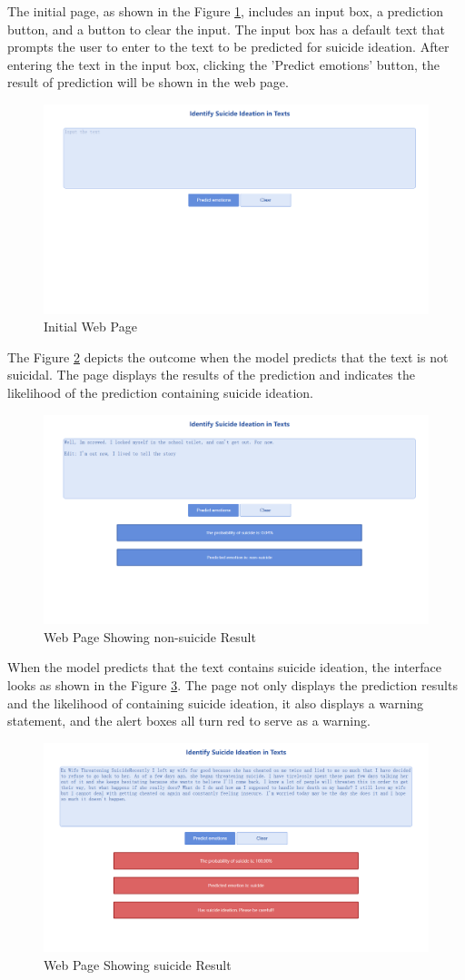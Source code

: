 \documentclass[ %
                    author={Bocheng Wang},
                supervisor={Dr. Qiang Liu},
                    degree={MSc},
                     title={A Research on Identification of Suicide Ideation in Texts with Multiple Models},
                      type={},
                      year={2024}]{dissertation}
\begin{document}
The initial page, as shown in the Figure \ref{fig:pageinitial}, includes an input box, a prediction button, and a button to clear the input. The input box has a default text that prompts the user to enter to the text to be predicted for suicide ideation. After entering the text in the input box, clicking the 'Predict emotions' button, the result of prediction will be shown in the web page.

\begin{figure}[h]
      \centering
      \includegraphics[width=0.57\linewidth]{../img/page_initial.png}
      \caption{Initial Web Page}
      \label{fig:pageinitial}
\end{figure}

The Figure \ref{fig:pagenon} depicts the outcome when the model predicts that the text is not suicidal. The page displays the results of the prediction and indicates the likelihood of the prediction containing suicide ideation.

\begin{figure}[h]
      \centering
      \includegraphics[width=0.57\linewidth]{../img/page_nonsuicide.png}
      \caption{Web Page Showing non-suicide Result}
      \label{fig:pagenon}
\end{figure}

When the model predicts that the text contains suicide ideation, the interface looks as shown in the Figure \ref{fig:pagesui}. The page not only displays the prediction results and the likelihood of containing suicide ideation, it also displays a warning statement, and the alert boxes all turn red to serve as a warning.

\begin{figure}[h]
      \centering
      \includegraphics[width=0.57\linewidth]{../img/page_suicide.png}
      \caption{Web Page Showing suicide Result}
      \label{fig:pagesui}
\end{figure}
\end{document}
